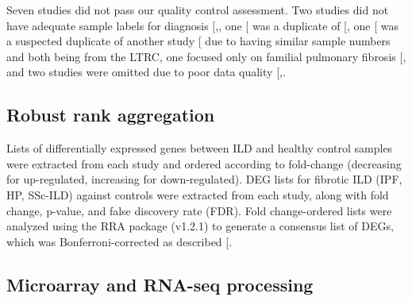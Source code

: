 \documentclass[
]{article}
\begin{document}
Seven studies did not pass our quality control assessment. Two studies did not have adequate sample labels for diagnosis {[},\citeproc{ref-zhu_integration_2018}{124}{]}, one {[}\citeproc{ref-christmann_association_2014}{125}{]} was a duplicate of {[}\citeproc{ref-christmann_mir-155_2016}{81}{]}, one {[}\citeproc{ref-ghosh_lung_2022}{126}{]} was a suspected duplicate of another study {[}\citeproc{ref-borie_colocalization_2022}{69}{]} due to having similar sample numbers and both being from the LTRC, one focused only on familial pulmonary fibrosis {[}\citeproc{ref-el-chemaly_immunome_2018}{127}{]}, and two studies were omitted due to poor data quality {[},\citeproc{ref-zhou_integrated_2019}{128}{]}.

\subsection{Robust rank aggregation}\label{robust-rank-aggregation}

Lists of differentially expressed genes between ILD and healthy control samples were extracted from each study and ordered according to fold-change (decreasing for up-regulated, increasing for down-regulated). DEG lists for fibrotic ILD (IPF, HP, SSc-ILD) against controls were extracted from each study, along with fold change, p-value, and false discovery rate (FDR). Fold change-ordered lists were analyzed using the RRA package (v1.2.1) to generate a consensus list of DEGs, which was Bonferroni-corrected as described {[}\citeproc{ref-vosa_comprehensive_2014}{129}{]}.

\subsection{Microarray and RNA-seq processing}\label{microarray-and-rna-seq-processing}
\end{document}
